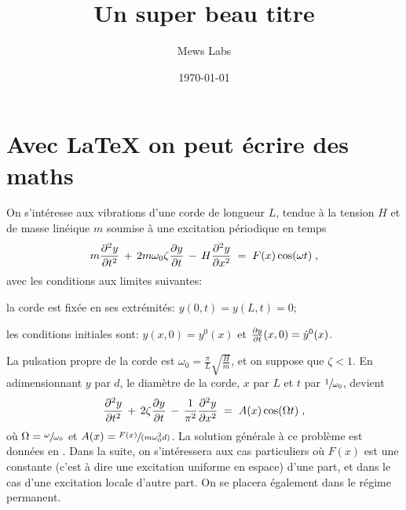 \documentclass[a4paper, french, 10pt]{article}
\title{Un super beau titre}
\author{Mews Labs}
\date{\today}
\newcommand{\w}{\omega}
\newcommand{\wz}{\omega_0}
\begin{document}

\maketitle
\abstract{\lipsum[1]}



\section{Avec \LaTeX{} on peut écrire des maths}

On s'intéresse aux vibrations d'une corde de longueur $L$, tendue à la tension $H$ et de masse linéique $m$
soumise à une excitation périodique en temps
%
\begin{equation}
    \label{eq:wave}
    m\ddpart{y}{t} \,+\, 2m\wz\zeta\dpart{y}{t} \,-\, H \ddpart{y}{x} \;=\; F(x)\cos(\w t) \;,
\end{equation}
%
avec les conditions aux limites suivantes:
%
\begin{mitemize}
    \item la corde est fixée en ses extrémités: $y(0, t) = y(L, t) = 0$;
    \item les conditions initiales sont: $y(x, 0) = y^0(x)$ et $\frac{\partial y}{\partial t}(x, 0) = \dot{y}^0(x)$.
\end{mitemize}
%
La pulsation propre de la corde est $\wz=\frac{\pi}{L}\sqrt{\frac{H}{m}}$, et on suppose que $\zeta < 1$.
En adimensionnant $y$ par $d$, le diamètre de la corde, $x$ par $L$ et $t$ par $\sfrac{1}{\wz}$, 
devient
%
\begin{equation}
    \label{eq:wadim}
    \frac{\partial^{2} y}{\partial {t}^{2}} \,+\, 2\zeta\frac{\partial y}{\partial t} \,-\, \frac{1}{\pi^2} \frac{\partial^{2} y}{\partial {x}^{2}} \;=\; A(x)\cos(\Omega t) \;,
\end{equation}
%
où $\Omega = \sfrac{\w}{\wz}$ et $A(x) = \sfrac{F(x)}{(m\wz^2 d)}$. La solution générale à ce problème est
données en . Dans la suite, on s'intéressera aux cas particuliers où $F(x)$ est une constante
(c'est à dire une excitation uniforme en espace) d'une part, et dans le cas d'une excitation locale d'autre part.
On se placera également dans le régime permanent.

\end{document}
